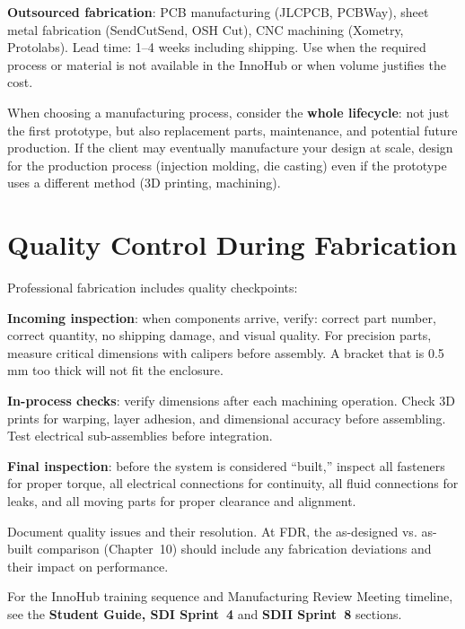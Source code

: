 \textbf{Outsourced fabrication}: PCB manufacturing (JLCPCB, PCBWay), sheet metal fabrication (SendCutSend, OSH Cut), CNC machining (Xometry, Protolabs). Lead time: 1--4 weeks including shipping. Use when the required process or material is not available in the InnoHub or when volume justifies the cost.

\begin{tipbox}
When choosing a manufacturing process, consider the \textbf{whole lifecycle}: not just the first prototype, but also replacement parts, maintenance, and potential future production. If the client may eventually manufacture your design at scale, design for the production process (injection molding, die casting) even if the prototype uses a different method (3D printing, machining).
\end{tipbox}

\section{Quality Control During Fabrication}
Professional fabrication includes quality checkpoints:

\textbf{Incoming inspection}: when components arrive, verify: correct part number, correct quantity, no shipping damage, and visual quality. For precision parts, measure critical dimensions with calipers before assembly. A bracket that is 0.5\,mm too thick will not fit the enclosure.

\textbf{In-process checks}: verify dimensions after each machining operation. Check 3D prints for warping, layer adhesion, and dimensional accuracy before assembling. Test electrical sub-assemblies before integration.

\textbf{Final inspection}: before the system is considered ``built,'' inspect all fasteners for proper torque, all electrical connections for continuity, all fluid connections for leaks, and all moving parts for proper clearance and alignment.

Document quality issues and their resolution. At FDR, the as-designed vs. as-built comparison (Chapter~10) should include any fabrication deviations and their impact on performance.



\begin{tipbox}
For the InnoHub training sequence and Manufacturing Review Meeting timeline, see the \textbf{Student Guide, SDI Sprint~4} and \textbf{SDII Sprint~8} sections.
\end{tipbox}

